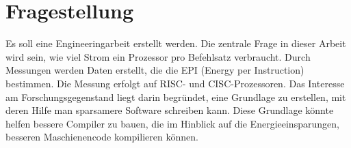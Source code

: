 \section{Fragestellung}

Es soll eine Engineeringarbeit erstellt werden. Die zentrale Frage in dieser Arbeit wird sein, wie viel Strom ein Prozessor pro Befehlsatz
verbraucht. Durch Messungen werden Daten erstellt, die die EPI (Energy per Instruction)
bestimmen. Die Messung erfolgt auf RISC- und CISC-Prozessoren. Das Interesse am Forschungsgegenstand liegt darin begründet, eine Grundlage
zu erstellen, mit deren Hilfe man sparsamere Software schreiben kann. Diese Grundlage könnte helfen bessere Compiler zu bauen,
die im Hinblick auf die Energieeinsparungen, besseren Maschienencode kompilieren können. 

